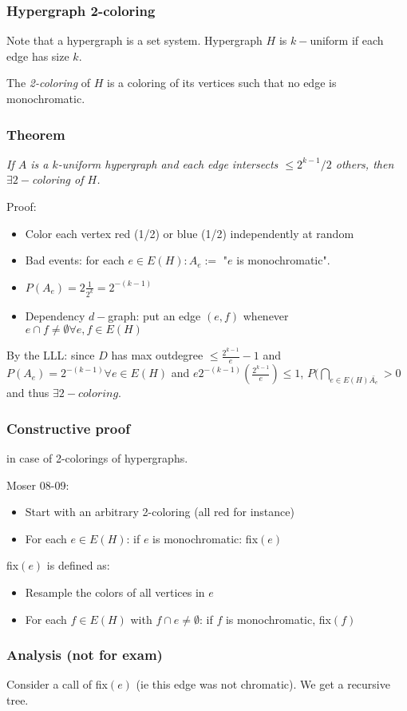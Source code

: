\subsubsection{Hypergraph 2-coloring}
Note that a hypergraph is a set system. Hypergraph $H$ is $k-$uniform if each edge has size $k$.

The \textit{2-coloring} of $H$ is a coloring of its vertices such that no edge is monochromatic.

\subsubsection{Theorem} 
\textit{If $A$ is a $k$-uniform hypergraph and each edge intersects $\leq 2^{k-1}/2$ others, then $\exists 2-$coloring of $H$.}

Proof: \begin{itemize}
	\item Color each vertex red (1/2) or blue (1/2) independently at random
	\item Bad events: for each $e \in E(H) : A_e := $ "$e$ is monochromatic".
	\item $P(A_e) = 2 \frac{1}{2^k} = 2^{-(k-1)}$
	\item Dependency $d-$graph: put an edge $(e,f)$ whenever $e \cap f \neq \emptyset \forall e, f \in E(H)$
\end{itemize}

By the LLL: since $D$ has max outdegree $\leq \frac{2^{k-1}}{e} -1$ and $P(A_e) = 2^{-(k-1)} \forall e \in E(H)$ and $e 2^{-(k-1)} \left( \frac{2^{k-1}}{e} \right) \leq 1$, $P(\bigcap_{e \in E(H) \bar{A_e}} > 0$ and thus $\exists 2-coloring$.

\subsubsection{Constructive proof}
in case of 2-colorings of hypergraphs.

Moser 08-09:
\begin{itemize}
	\item Start with an arbitrary 2-coloring (all red for instance)
	\item For each $e \in E(H)$: if $e$ is monochromatic: fix$(e)$
\end{itemize}

fix$(e)$ is defined as:
\begin{itemize}
	\item Resample the colors of all vertices in $e$
	\item For each $f \in E(H)$ with $f \cap e \neq \emptyset$: if $f$ is monochromatic, fix$(f)$
\end{itemize}


\subsubsection{Analysis (not for exam)}
Consider a call of fix$(e)$ (ie this edge was not chromatic). We get a recursive tree.

